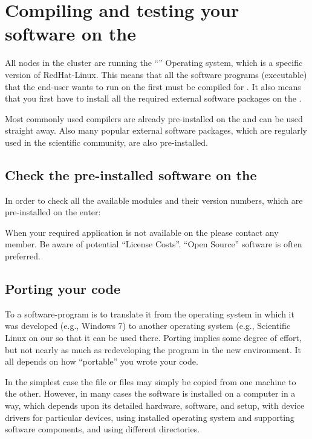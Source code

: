 \chapter{Compiling and testing your software on the \hpc}

All nodes in the \hpc cluster are running the ``\operatingsystem'' Operating
system, which is a specific version of RedHat-Linux. This means that all the
software programs (executable) that the end-user wants to run on the \hpc first
must be compiled for \operatingsystem.  It also means that you first have to
install all the required external software packages on the \hpc.

Most commonly used compilers are already pre-installed on the \hpc and can
be used straight away. Also many popular external software packages, which are
regularly used in the scientific community, are also pre-installed.

\section{Check the pre-installed software on the \hpc}

In order to check all the available modules and their version numbers, which
are pre-installed on the \hpc enter:


When your required application is not available on the \hpc please contact any
\hpc member. Be aware of potential ``License Costs''.  ``Open Source'' software
is often preferred.

\section{Porting your code}

To  a software-program is to translate it from the operating
system in which it was developed (e.g., Windows 7) to another operating system
(e.g., Scientific Linux on our \hpc so that it can be used there. Porting
implies some degree of effort, but not nearly as much as redeveloping the
program in the new environment.  It all depends on how ``portable'' you wrote
your code.

In the simplest case the file or files may simply be copied from one machine to
the other. However, in many cases the software is installed on a computer in a
way, which depends upon its detailed hardware, software, and setup, with device
drivers for particular devices, using installed operating system and supporting
software components, and using different directories.

